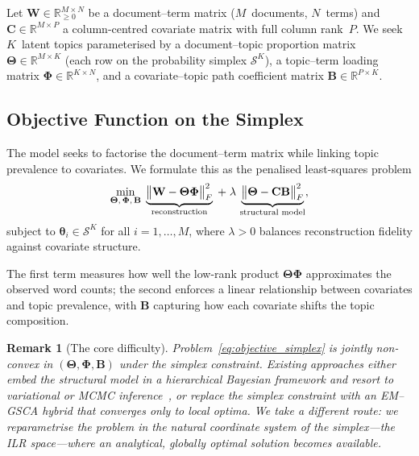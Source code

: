 \documentclass{article}
\newtheorem{remark}{Remark}
\begin{document}
Let $\mathbf{W}\in\mathbb{R}_{\geq 0}^{M\times N}$ be a document--term
matrix ($M$~documents, $N$~terms) and
$\mathbf{C}\in\mathbb{R}^{M\times P}$ a column-centred covariate matrix
with full column rank~$P$. We seek $K$~latent topics parameterised by
a document--topic proportion matrix
$\boldsymbol{\Theta}\in\mathbb{R}^{M\times K}$ (each row on the
probability simplex $\mathcal{S}^K$), a topic--term loading matrix
$\boldsymbol{\Phi}\in\mathbb{R}^{K\times N}$, and a covariate--topic
path coefficient matrix $\mathbf{B}\in\mathbb{R}^{P\times K}$.


\subsection{Objective Function on the Simplex}
\label{subsec:objective_simplex}

The model seeks to factorise the document--term matrix while linking
topic prevalence to covariates. We formulate this as the penalised
least-squares problem
%
\begin{equation}
  \min_{\boldsymbol{\Theta},\,\boldsymbol{\Phi},\,\mathbf{B}}\;
  \underbrace{%
    \bigl\|\mathbf{W}
      - \boldsymbol{\Theta}\boldsymbol{\Phi}\bigr\|_F^2
  }_{\text{reconstruction}}
  \;+\;
  \lambda\,
  \underbrace{%
    \bigl\|\boldsymbol{\Theta}
      - \mathbf{C}\mathbf{B}\bigr\|_F^2
  }_{\text{structural model}},
  \label{eq:objective_simplex}
\end{equation}
%
subject to
$\boldsymbol{\theta}_i\in\mathcal{S}^K$ for all $i=1,\dots,M$,
where $\lambda>0$ balances reconstruction fidelity against covariate
structure.

The first term measures how well the low-rank product
$\boldsymbol{\Theta}\boldsymbol{\Phi}$ approximates the observed word
counts; the second enforces a linear relationship between covariates
and topic prevalence, with $\mathbf{B}$ capturing how each covariate
shifts the topic composition.

\begin{remark}[The core difficulty]
\label{rem:core_difficulty}
Problem~\eqref{eq:objective_simplex} is jointly non-convex in
$(\boldsymbol{\Theta},\boldsymbol{\Phi},\mathbf{B})$ under the
simplex constraint. Existing approaches either embed the structural
model in a hierarchical Bayesian framework and resort to variational
or MCMC inference~\citep{roberts2014stm}, or replace the simplex
constraint with an EM--GSCA hybrid that converges only to local
optima. We take a different route: we reparametrise the problem in
the natural coordinate system of the simplex---the ILR space---where
an analytical, globally optimal solution becomes available.
\end{remark}
\end{document}
